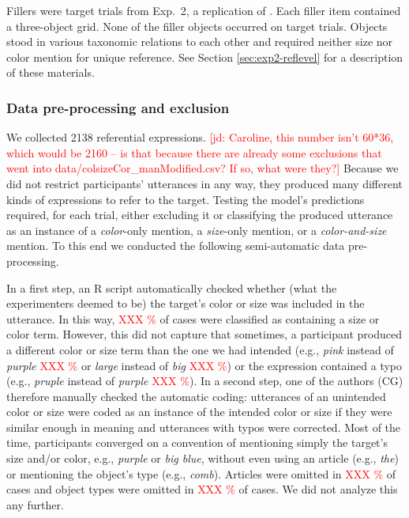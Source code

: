 \documentclass[11pt]{article}
\newcommand{\red}[1]{\textcolor{Red}{#1}}
\newcommand{\jd}[1]{\textcolor{Red}{[jd: #1]}}
\newcommand{\sectionref}[1]{Section \ref{#1}}
\begin{document}
Fillers were target trials from Exp.~2, a replication of \cite{graf2016}. Each filler item contained a three-object grid. None of the filler objects occurred on target trials. Objects stood in various taxonomic relations to each other and required neither size nor color mention for unique reference. See \sectionref{sec:exp2-reflevel} for a description of these materials.

\subsubsection{Data pre-processing and exclusion}

We collected 2138 referential expressions. \jd{Caroline, this number isn't 60*36, which would be 2160 -- is that because there are already some exclusions that went into data/colsizeCor\_manModified.csv? If so, what were they?} Because we did not restrict participants' utterances in any way, they produced many different kinds of expressions to refer to the target. Testing the model's predictions required, for each trial, either excluding it or classifying the produced utterance as an instance of a \emph{color}-only mention, a \emph{size}-only mention, or a \emph{color-and-size} mention. To this end we conducted the following semi-automatic data pre-processing. 

In a first step, an R script automatically checked whether (what the experimenters deemed to be) the target's color or size was included in the utterance. In this way, \red{XXX \%} of cases were classified as containing a size or color term. However, this did not capture that sometimes, a participant produced a different color or size term than the one we had intended (e.g., \emph{pink} instead of \emph{purple} \red{XXX \%} or \emph{large} instead of \emph{big} \red{XXX \%}) or the expression contained a typo (e.g., \emph{pruple} instead of \emph{purple} \red{XXX \%}). In a second step, one of the authors (CG) therefore manually checked the automatic coding: utterances of an unintended color or size were coded as an instance of the intended color or size if they were similar enough in meaning and utterances with typos were corrected.   Most of the time, participants converged on a convention of mentioning simply the target's size and/or color, e.g., \emph{purple} or \emph{big blue}, without even using an article (e.g., \emph{the}) or mentioning the object's type (e.g., \emph{comb}). Articles were omitted in \red{XXX \%} of cases and object types were omitted in \red{XXX \%} of cases. We did not analyze this any further.
\end{document}
